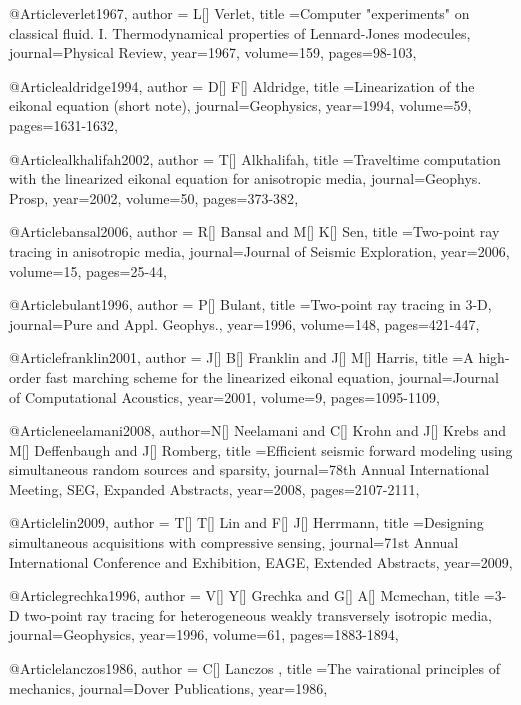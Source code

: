 {@Article{verlet1967,
  author = {L[] Verlet},
  title ={Computer "experiments" on classical fluid. I. Thermodynamical properties of Lennard-Jones modecules},
  journal={Physical Review},
  year=1967,
  volume=159,
  pages={98-103},
}


@Article{aldridge1994,
  author = {D[] F[] Aldridge},
  title ={Linearization of the eikonal equation (short note)},
  journal={Geophysics},
  year=1994,
  volume=59,
  pages={1631-1632},
}

@Article{alkhalifah2002,
  author = {T[] Alkhalifah},
  title ={Traveltime computation with the linearized eikonal equation for anisotropic media},
  journal={Geophys. Prosp},
  year=2002,
  volume=50,
  pages={373-382},
}

@Article{bansal2006,
  author = {R[] Bansal and M[] K[] Sen},
  title ={Two-point ray tracing in anisotropic media},
  journal={Journal of Seismic Exploration},
  year=2006,
  volume=15,
  pages={25-44},
}

@Article{bulant1996,
  author = {P[] Bulant},
  title ={Two-point ray tracing in 3-D},
  journal={Pure and Appl. Geophys.},
  year=1996,
  volume=148,
  pages={421-447},
}


@Article{franklin2001,
  author = {J[] B[] Franklin and J[] M[] Harris},
  title ={A high-order fast marching scheme for the linearized eikonal equation},
  journal={Journal of Computational Acoustics},
  year=2001,
  volume=9,
  pages={1095-1109},
}

@Article{neelamani2008,
  author={N[] Neelamani and C[] Krohn and J[] Krebs and M[] Deffenbaugh and J[] Romberg},
  title ={Efficient seismic forward modeling using simultaneous random sources and sparsity},
  journal={78th Annual International Meeting, SEG, Expanded Abstracts},
  year=2008,
  pages={2107-2111},
}

@Article{lin2009,
  author = {T[] T[] Lin and F[] J[] Herrmann},
  title ={Designing simultaneous acquisitions with compressive sensing},
  journal={71st Annual International Conference and Exhibition, EAGE, Extended Abstracts},
  year=2009,
}

@Article{grechka1996,
  author = {V[] Y[] Grechka and G[] A[] Mcmechan},
  title ={3-D two-point ray tracing for heterogeneous weakly transversely isotropic media},
  journal={Geophysics},
  year=1996,
  volume=61,
  pages={1883-1894},
}

@Article{lanczos1986,
  author = {C[] Lanczos },
  title ={The vairational principles of mechanics},
  journal={Dover Publications},
  year=1986,
}

}
